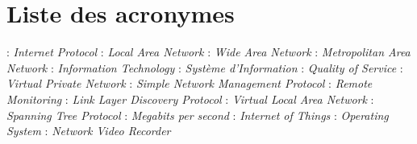 
\chapter*{Liste des acronymes}
\begin{acronym}
\Large

 :  {\emph{ Internet Protocol}}
 :  {\emph{ Local Area Network}}
 :  {\emph{ Wide Area Network}}
 :  {\emph{ Metropolitan Area Network}}
 :  {\emph{ Information Technology}}
 :  {\emph{ Système d'Information}}
 :  {\emph{ Quality of Service}}
 :  {\emph{ Virtual Private Network}}
 :  {\emph{ Simple Network Management Protocol}}
 :  {\emph{ Remote Monitoring}}
 :  {\emph{ Link Layer Discovery Protocol}}
 :  {\emph{ Virtual Local Area Network}}
 :  {\emph{ Spanning Tree Protocol}}
 :  {\emph{ Megabits per second}}
 :  {\emph{ Internet of Things}}
 :  {\emph{ Operating System}}
 : {\emph{ Network Video Recorder}}


\end{acronym}
\normalsize